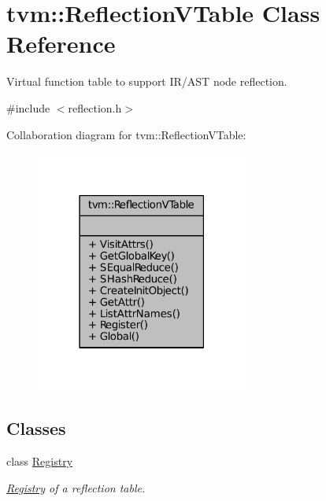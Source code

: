\hypertarget{classtvm_1_1ReflectionVTable}{}\section{tvm\+:\+:Reflection\+V\+Table Class Reference}
\label{classtvm_1_1ReflectionVTable}


Virtual function table to support I\+R/\+A\+ST node reflection.  




{\ttfamily \#include $<$reflection.\+h$>$}



Collaboration diagram for tvm\+:\+:Reflection\+V\+Table\+:
\nopagebreak
\begin{figure}[H]
\begin{center}
\leavevmode
\includegraphics[width=198pt]{classtvm_1_1ReflectionVTable__coll__graph}
\end{center}
\end{figure}
\subsection*{Classes}
\begin{DoxyCompactItemize}
\item 
class \hyperlink{classtvm_1_1ReflectionVTable_1_1Registry}{Registry}
\begin{DoxyCompactList}\small\item\em \hyperlink{classtvm_1_1ReflectionVTable_1_1Registry}{Registry} of a reflection table. \end{DoxyCompactList}\end{DoxyCompactItemize}
